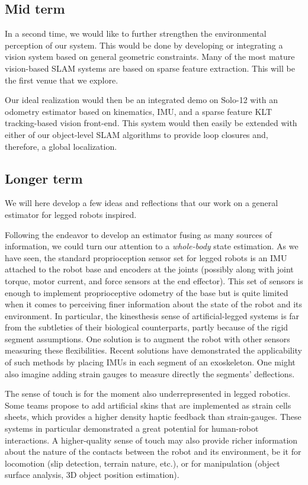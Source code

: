 \subsection{Mid term}

In a second time, we would like to further strengthen the environmental perception of our system. This would be done by developing or integrating a vision system
based on general geometric constraints. Many of the most mature vision-based SLAM systems are based on sparse feature extraction. This will be 
the first venue that we explore. 

Our ideal realization would then be an integrated demo on Solo-12 with an odometry estimator based on kinematics, IMU, and a sparse feature KLT tracking-based 
vision front-end. This system would then easily be extended with either of our object-level SLAM algorithms to provide loop closures and, therefore, a global localization.



\subsection{Longer term}

We will here develop a few ideas and reflections that our work on a general estimator for legged robots inspired.

Following the endeavor to develop an estimator fusing as many sources of information, we could turn our attention to a 
\textit{whole-body} state estimation. As we have seen, the standard proprioception sensor set for legged robots is an IMU attached to the robot base
and encoders at the joints (possibly along with joint torque, motor current, and force sensors at the end effector). This set of sensors
is enough to implement proprioceptive odometry of the base but is quite limited when it comes to perceiving finer information about the state of the robot
and its environment. In particular, the kinesthesis sense of artificial-legged systems is far from the subtleties of their biological counterparts, partly
because of the rigid segment assumptions. One solution is to augment the robot with other sensors measuring these flexibilities. Recent solutions have demonstrated
the applicability of such methods by placing IMUs in each segment of an exoskeleton. One might also imagine adding strain gauges to measure directly 
the segments' deflections. 

The sense of touch is for the moment also underrepresented in legged robotics. Some teams propose to add
artificial skins that are implemented as strain cells sheets, which provides a higher density haptic feedback than strain-gauges. 
These systems in particular demonstrated a great potential for human-robot interactions. 
A higher-quality sense of touch may also provide richer information about the nature of the contacts between the robot and its environment, be it for locomotion
(slip detection, terrain nature, etc.), or for manipulation (object surface analysis, 3D object position estimation). 

